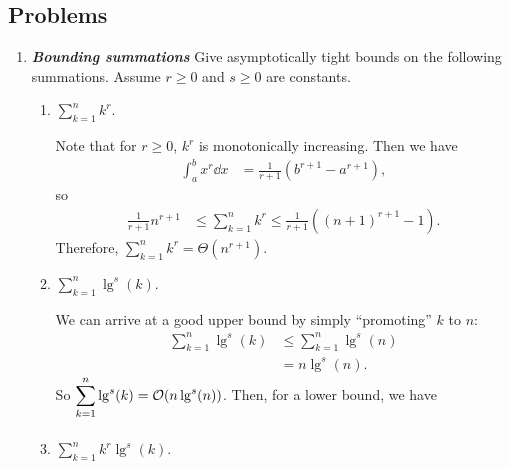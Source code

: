 \documentclass[AppendixA]{subfiles}
\begin{document}
	\subsection*{Problems}

	\begin{enumerate}[leftmargin=\labelsep,label={\textbf{\thesection-\arabic*}}]
		\item \textbf{\textit{Bounding summations}} Give asymptotically tight bounds on the following summations. Assume $r \geq 0$ and $s \geq 0$ are constants.
		\begin{enumerate}
			\item $\displaystyle \sum_{k = 1}^n k^r$.
			\begin{answer}
				Note that for $r \geq 0$, $k^r$ is monotonically increasing. Then we have
				\begin{align*}
					\int_a^b x^r \dd x &= \frac{1}{r + 1}(b^{r + 1} - a^{r + 1}),
				\end{align*}
				so
				\begin{align*}
					\frac{1}{r + 1} n^{r + 1} &\leq \sum_{k = 1}^n k^r \leq \frac{1}{r + 1}((n + 1)^{r + 1} - 1).
				\end{align*}
				Therefore, $\displaystyle \sum_{k = 1}^n k^r = \Theta(n^{r + 1})$.
			\end{answer}

			\item $\displaystyle \sum_{k = 1}^n \lg^s(k)$.
			\begin{answer}
				We can arrive at a good upper bound by simply ``promoting'' $k$ to $n$:
				\begin{align*}
					\sum_{k = 1}^n \lg^s(k) &\leq \sum_{k = 1}^n \lg^s(n)\\
						&= n\lg^s(n).
				\end{align*}
				So $\displaystyle \sum_{k = 1}^n \lg^s(k) = \mathcal{O}(n\lg^s(n))$. Then, for a lower bound, we have
				\begin{align*}
					
				\end{align*}
			\end{answer}
			
			\item $\displaystyle \sum_{k = 1}^n k^r\lg^s(k)$.
			\begin{answer}
				
			\end{answer}
			
		\end{enumerate}
	\end{enumerate}
\end{document}
